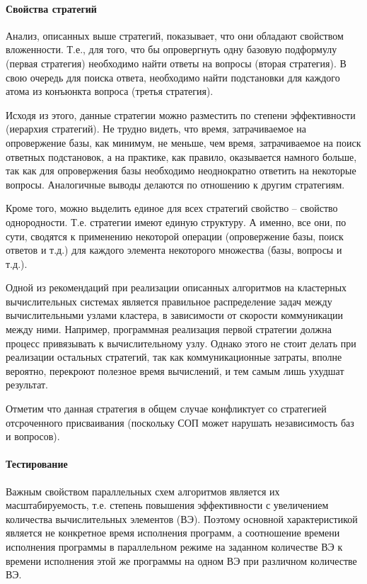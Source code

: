 \paragraph{Свойства стратегий}

Анализ, описанных выше стратегий, показывает, что они обладают свойством вложенности. Т.е., для того, что бы опровергнуть одну базовую подформулу (первая стратегия) необходимо найти ответы на вопросы (вторая стратегия). В свою очередь для поиска ответа, необходимо найти подстановки для каждого атома из конъюнкта вопроса (третья стратегия).

Исходя из этого, данные стратегии можно разместить по степени эффективности (иерархия стратегий). Не трудно видеть, что время, затрачиваемое на опровержение базы, как минимум, не меньше, чем время, затрачиваемое на поиск ответных подстановок, а на практике, как правило, оказывается намного больше, так как для опровержения базы необходимо неоднократно ответить на некоторые вопросы. Аналогичные выводы делаются по отношению к другим стратегиям.

Кроме того, можно выделить единое для всех стратегий свойство – свойство однородности. Т.е. стратегии имеют единую структуру. А именно, все они, по сути, сводятся к применению некоторой операции (опровержение базы, поиск ответов и т.д.) для каждого элемента некоторого множества (базы, вопросы и т.д.).

Одной из рекомендаций при реализации описанных алгоритмов на кластерных вычислительных системах является правильное распределение задач между вычислительными узлами кластера, в зависимости от скорости коммуникации между ними. Например, программная реализация первой стратегии должна процесс привязывать к вычислительному узлу. Однако этого не стоит делать при реализации остальных стратегий, так как коммуникационные затраты, вполне вероятно, перекроют полезное время вычислений, и тем самым лишь ухудшат результат.

Отметим что данная стратегия в общем случае конфликтует со стратегией отсроченного присваивания (поскольку СОП может нарушать независимость баз и вопросов). 

\paragraph{Тестирование}
Важным свойством параллельных схем алгоритмов является их масштабируемость, т.е. степень повышения эффективности с увеличением количества вычислительных элементов (ВЭ). Поэтому основной характеристикой является не конкретное время исполнения программ, а соотношение времени исполнения программы в параллельном режиме на заданном количестве ВЭ к времени исполнения этой же программы на одном ВЭ при различном количестве ВЭ.

